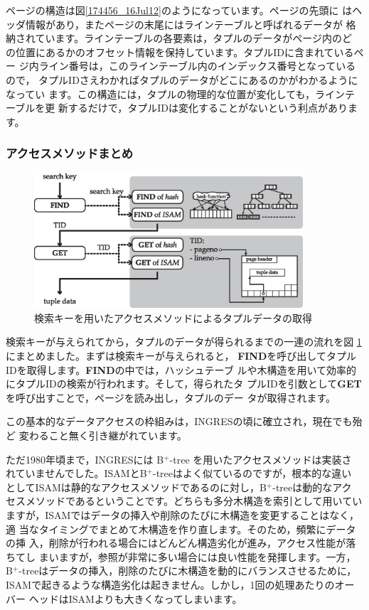 ページの構造は図\ref{174456_16Jul12}のようになっています。ページの先頭に
はヘッダ情報があり，またページの末尾にはラインテーブルと呼ばれるデータが
格納されています。ラインテーブルの各要素は，タプルのデータがページ内のど
の位置にあるかのオフセット情報を保持しています。タプルIDに含まれているペー
ジ内ライン番号は，このラインテーブル内のインデックス番号となっているので，
タプルIDさえわかればタプルのデータがどこにあるのかがわかるようになってい
ます。この構造には，タプルの物理的な位置が変化しても，ラインテーブルを更
新するだけで，タプルIDは変化することがないという利点があります。


\subsubsection{アクセスメソッドまとめ}


\begin{figure}
 \begin{center}
  \includegraphics[width=100mm]{hayamiz/images/access-method.eps}
  \caption{検索キーを用いたアクセスメソッドによるタプルデータの取得}
  \label{190817_16Jul12}
 \end{center}
\end{figure}


検索キーが与えられてから，タプルのデータが得られるまでの一連の流れを図
\ref{190817_16Jul12}にまとめました。まずは検索キーが与えられると，{\bf
FIND}を呼び出してタプルIDを取得します。{\bf FIND}の中では，ハッシュテーブ
ルや木構造を用いて効率的にタプルIDの検索が行われます。そして，得られたタ
プルIDを引数として{\bf GET}を呼び出すことで，ページを読み出し，タプルのデー
タが取得されます。


この基本的なデータアクセスの枠組みは，INGRESの頃に確立され，現在でも殆ど
変わること無く引き継がれています。


ただ1980年頃まで，INGRESには B$^+$-tree を用いたアクセスメソッドは実装さ
れていませんでした。ISAMとB$^+$-treeはよく似ているのですが，根本的な違い
としてISAMは静的なアクセスメソッドであるのに対し，B$^+$-treeは動的なアク
セスメソッドであるということです。どちらも多分木構造を索引として用いてい
ますが，ISAMではデータの挿入や削除のたびに木構造を変更することはなく，適
当なタイミングでまとめて木構造を作り直します。そのため，頻繁にデータの挿
入，削除が行われる場合にはどんどん構造劣化が進み，アクセス性能が落ちてし
まいますが，参照が非常に多い場合には良い性能を発揮します。一方，
B$^+$-treeはデータの挿入，削除のたびに木構造を動的にバランスさせるために，
ISAMで起きるような構造劣化は起きません。しかし，1回の処理あたりのオーバー
ヘッドはISAMよりも大きくなってしまいます。



